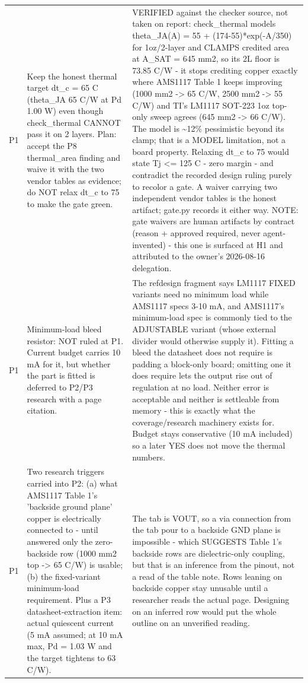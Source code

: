 \documentclass[11pt,a4paper]{article}
\begin{document}
{\begin{longtable}{lp{5.2cm}p{7.2cm}}
P1 & Keep the honest thermal target dt\_c = 65 C (theta\_JA 65 C/W at Pd 1.00 W) even though check\_thermal CANNOT pass it on 2 layers. Plan: accept the P8 thermal\_area finding and waive it with the two vendor tables as evidence; do NOT relax dt\_c to 75 to make the gate green. & VERIFIED against the checker source, not taken on report: check\_thermal models theta\_JA(A) = 55 + (174-55){*}exp(-A/350) for 1oz/2-layer and CLAMPS credited area at A\_SAT = 645 mm2, so its 2L floor is 73.85 C/W - it stops crediting copper exactly where AMS1117 Table 1 keeps improving (1000 mm2 -\textgreater{} 65 C/W, 2500 mm2 -\textgreater{} 55 C/W) and TI's LM1117 SOT-223 1oz top-only sweep agrees (645 mm2 -\textgreater{} 66 C/W). The model is \textasciitilde{}12\% pessimistic beyond its clamp; that is a MODEL limitation, not a board property. Relaxing dt\_c to 75 would state Tj \textless{}= 125 C - zero margin - and contradict the recorded design ruling purely to recolor a gate. A waiver carrying two independent vendor tables is the honest artifact; gate.py records it either way. NOTE: gate waivers are human artifacts by contract (reason + approved required, never agent-invented) - this one is surfaced at H1 and attributed to the owner's 2026-08-16 delegation. \\
P1 & Minimum-load bleed resistor: NOT ruled at P1. Current budget carries 10 mA for it, but whether the part is fitted is deferred to P2/P3 research with a page citation. & The refdesign fragment says LM1117 FIXED variants need no minimum load while AMS1117 specs 3-10 mA, and AMS1117's minimum-load spec is commonly tied to the ADJUSTABLE variant (whose external divider would otherwise supply it). Fitting a bleed the datasheet does not require is padding a block-only board; omitting one it does require lets the output rise out of regulation at no load. Neither error is acceptable and neither is settleable from memory - this is exactly what the coverage/research machinery exists for. Budget stays conservative (10 mA included) so a later YES does not move the thermal numbers. \\
P1 & Two research triggers carried into P2: (a) what AMS1117 Table 1's 'backside ground plane' copper is electrically connected to - until answered only the zero-backside row (1000 mm2 top -\textgreater{} 65 C/W) is usable; (b) the fixed-variant minimum-load requirement. Plus a P3 datasheet-extraction item: actual quiescent current (5 mA assumed; at 10 mA max, Pd = 1.03 W and the target tightens to 63 C/W). & The tab is VOUT, so a via connection from the tab pour to a backside GND plane is impossible - which SUGGESTS Table 1's backside rows are dielectric-only coupling, but that is an inference from the pinout, not a read of the table note. Rows leaning on backside copper stay unusable until a researcher reads the actual page. Designing on an inferred row would put the whole outline on an unverified reading. \\

\end{longtable}}
\end{document}
